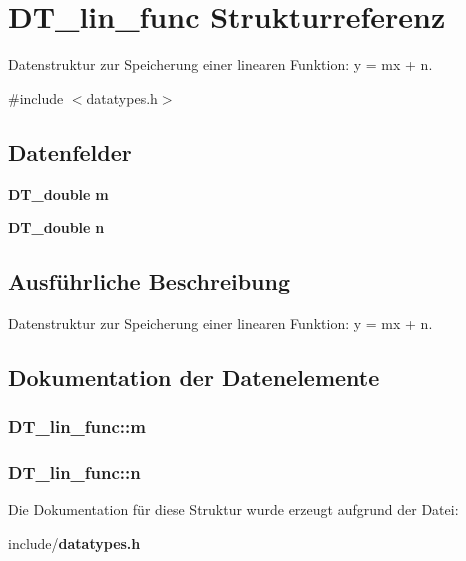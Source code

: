 \section{DT\_\-lin\_\-func Strukturreferenz}
\label{struct_d_t__lin__func}


Datenstruktur zur Speicherung einer linearen Funktion: y = mx + n.  




{\ttfamily \#include $<$datatypes.h$>$}

\subsection*{Datenfelder}
\begin{DoxyCompactItemize}
\item 
{\bf DT\_\-double} {\bf m}
\item 
{\bf DT\_\-double} {\bf n}
\end{DoxyCompactItemize}


\subsection{Ausführliche Beschreibung}
Datenstruktur zur Speicherung einer linearen Funktion: y = mx + n. 

\subsection{Dokumentation der Datenelemente}
\subsubsection[{m}]{ {\bf DT\_\-lin\_\-func::m}}\label{struct_d_t__lin__func_a74b7bf2e9aebf17fcdae83f0a7cd4707}
\subsubsection[{n}]{ {\bf DT\_\-lin\_\-func::n}}\label{struct_d_t__lin__func_a3bf8bd5fc64f1ad35004c434fef43e17}


Die Dokumentation für diese Struktur wurde erzeugt aufgrund der Datei:\begin{DoxyCompactItemize}
\item 
include/{\bf datatypes.h}\end{DoxyCompactItemize}
